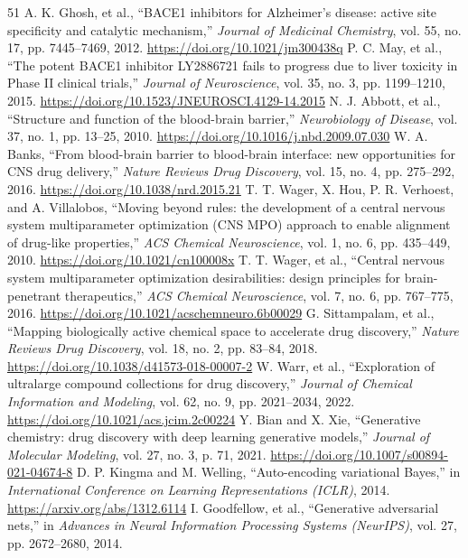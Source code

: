 \documentclass[10pt,a4paper]{article}
\begin{document}
\begin{thebibliography}{51}
 A. K. Ghosh, et al., ``BACE1 inhibitors for Alzheimer's disease: active site specificity and catalytic mechanism,'' \textit{Journal of Medicinal Chemistry}, vol. 55, no. 17, pp. 7445--7469, 2012. \url{https://doi.org/10.1021/jm300438q}
 P. C. May, et al., ``The potent BACE1 inhibitor LY2886721 fails to progress due to liver toxicity in Phase II clinical trials,'' \textit{Journal of Neuroscience}, vol. 35, no. 3, pp. 1199--1210, 2015. \url{https://doi.org/10.1523/JNEUROSCI.4129-14.2015}
 N. J. Abbott, et al., ``Structure and function of the blood-brain barrier,'' \textit{Neurobiology of Disease}, vol. 37, no. 1, pp. 13--25, 2010. \url{https://doi.org/10.1016/j.nbd.2009.07.030}
 W. A. Banks, ``From blood-brain barrier to blood-brain interface: new opportunities for CNS drug delivery,'' \textit{Nature Reviews Drug Discovery}, vol. 15, no. 4, pp. 275--292, 2016. \url{https://doi.org/10.1038/nrd.2015.21}
 T. T. Wager, X. Hou, P. R. Verhoest, and A. Villalobos, ``Moving beyond rules: the development of a central nervous system multiparameter optimization (CNS MPO) approach to enable alignment of drug-like properties,'' \textit{ACS Chemical Neuroscience}, vol. 1, no. 6, pp. 435--449, 2010. \url{https://doi.org/10.1021/cn100008x}
 T. T. Wager, et al., ``Central nervous system multiparameter optimization desirabilities: design principles for brain-penetrant therapeutics,'' \textit{ACS Chemical Neuroscience}, vol. 7, no. 6, pp. 767--775, 2016. \url{https://doi.org/10.1021/acschemneuro.6b00029}
 G. Sittampalam, et al., ``Mapping biologically active chemical space to accelerate drug discovery,'' \textit{Nature Reviews Drug Discovery}, vol. 18, no. 2, pp. 83--84, 2018. \url{https://doi.org/10.1038/d41573-018-00007-2}
 W. Warr, et al., ``Exploration of ultralarge compound collections for drug discovery,'' \textit{Journal of Chemical Information and Modeling}, vol. 62, no. 9, pp. 2021--2034, 2022. \url{https://doi.org/10.1021/acs.jcim.2c00224}
 Y. Bian and X. Xie, ``Generative chemistry: drug discovery with deep learning generative models,'' \textit{Journal of Molecular Modeling}, vol. 27, no. 3, p. 71, 2021. \url{https://doi.org/10.1007/s00894-021-04674-8}
 D. P. Kingma and M. Welling, ``Auto-encoding variational Bayes,'' in \textit{International Conference on Learning Representations (ICLR)}, 2014. \url{https://arxiv.org/abs/1312.6114}
 I. Goodfellow, et al., ``Generative adversarial nets,'' in \textit{Advances in Neural Information Processing Systems (NeurIPS)}, vol. 27, pp. 2672--2680, 2014.

\end{thebibliography}
\end{document}
